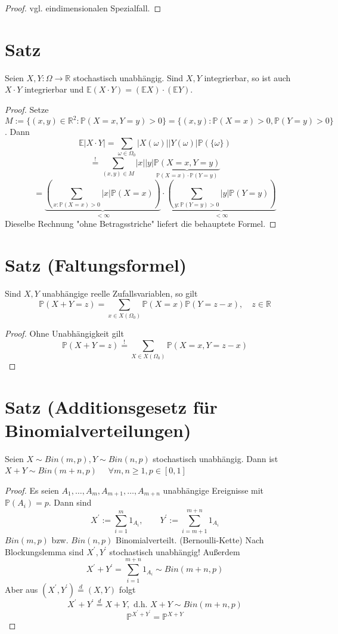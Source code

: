 \documentclass[a4paper,11pt,notitlepage]{report}
\newcommand{\R}{{\ensuremath{\mathbb{R}}}}
\newcommand{\Prim}{{\ensuremath{\mathbb{P}}}}
\newcommand{\E}{{\ensuremath{\mathbb{E}}}}
\begin{document}
\begin{proof}
vgl. eindimensionalen Spezialfall.
\end{proof}

\section{Satz}
Seien $X, Y \colon \Omega \rightarrow \R$ stochastisch unabhängig.
Sind $X,Y$ integrierbar, so ist auch $X \cdot Y$ integrierbar und $\mathbb{E}(X \cdot Y) = (\mathbb{E} X)\cdot(\mathbb{E} Y)$.

\begin{proof}
	Setze $M := \{(x,y) \in \R^2 \colon \Prim(X=x, Y=y) > 0 \} = \{(x,y) \colon \Prim(X=x) > 0, \Prim(Y=y) > 0\}$.
	Dann 
	$$\E | X \cdot Y | =  \sum\limits_{\omega \in \Omega_0}{|X(\omega)| |Y(\omega)| \Prim(\{\omega\})}$$
	$$\overset{!}{=} \sum\limits_{(x,y) \in M}{|x| |y| \underbrace{\Prim(X=x, Y=y)}_{\Prim(X=x) \cdot \Prim(Y=y)}}$$
	$$= \underbrace{\left(\sum\limits_{x \colon \Prim(X=x)>0}{|x| \Prim(X=x)}\right)}_{< \infty} \cdot \underbrace{\left(\sum\limits_{y \colon \Prim(Y=y)>0}{|y| \Prim(Y=y)}\right)}_{< \infty}$$
	Dieselbe Rechnung "ohne Betragsstriche" liefert die behauptete Formel.
\end{proof}

\section{Satz (Faltungsformel)}
Sind $X,Y$ unabhängige reelle Zufallsvariablen, so gilt 
$$\Prim(X+Y = z) = \sum\limits_{x \in X(\Omega_0)}{\Prim(X=x) \Prim(Y=z-x)}, \quad z \in \R$$

\begin{proof}
	Ohne Unabhängigkeit gilt
	$$\Prim(X+Y=z) \overset{!}{=} \sum\limits_{X \in X(\Omega_0)}{\Prim(X=x, Y=z-x)}$$
\end{proof}

\section{Satz (Additionsgesetz für Binomialverteilungen)}
Seien $X \sim Bin(m,p), Y \sim Bin(n,p)$ stochastisch unabhängig. \newline
Dann ist $X+Y \sim Bin(m+n,p)$ $\quad \forall m,n \geq 1, p \in [0,1]$

\begin{proof}
	Es seien $A_1, \ldots, A_m, A_{m+1}, \ldots, A_{m+n}$ unabhängige Ereignisse mit $\Prim(A_i)=p$.
	Dann sind
	$$X^\prime := \sum\limits_{i=1}^m{1_{A_i}}, \qquad Y^\prime := \sum\limits_{i=m+1}^{m+n}{1_{A_i}}$$
	$Bin(m,p)$ bzw. $Bin(n,p)$ Binomialverteilt. (Bernoulli-Kette)
	\newline
	Nach Blockungslemma sind $X^\prime, Y^\prime$ stochastisch unabhängig!
	Außerdem
	$$X^\prime + Y^\prime = \sum\limits_{i=1}^{m+n}{1_{A_i}} \sim Bin(m+n,p)$$
	Aber aus $(X^\prime, Y^\prime) \overset{d}{=} (X,Y)$ folgt
	$$X^\prime + Y^\prime \overset{d}{=} X+Y, \text{ d.h. $X+Y \sim Bin(m+n,p)$}$$
	$$\Prim^{X^\prime + Y^\prime} = \Prim^{X+Y}$$
\end{proof}
\end{document}
